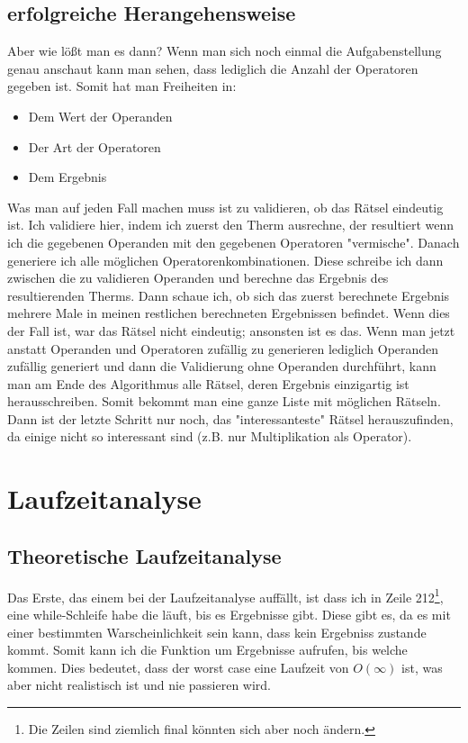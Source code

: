 \documentclass[a4paper,10pt,ngerman]{scrartcl}
\begin{document}
\subsection{erfolgreiche Herangehensweise}

Aber wie lößt man es dann?
\newline
Wenn man sich noch einmal die Aufgabenstellung genau anschaut kann man sehen, dass lediglich die Anzahl der Operatoren gegeben ist. Somit hat man Freiheiten in:
\begin{itemize}
\item Dem Wert der Operanden
\item Der Art der Operatoren
\item Dem Ergebnis
\end{itemize}
Was man auf jeden Fall machen muss ist zu validieren, ob das Rätsel eindeutig ist. Ich validiere hier, indem ich zuerst den Therm ausrechne, der resultiert wenn ich die gegebenen Operanden mit den gegebenen Operatoren "vermische". Danach generiere ich alle möglichen Operatorenkombinationen. Diese schreibe ich dann zwischen die zu validieren Operanden und berechne das Ergebnis des resultierenden Therms. Dann schaue ich, ob sich das zuerst berechnete Ergebnis mehrere Male in meinen restlichen berechneten Ergebnissen befindet. Wenn dies der Fall ist, war das Rätsel nicht eindeutig; ansonsten ist es das.
Wenn man jetzt anstatt Operanden und Operatoren zufällig zu generieren lediglich Operanden zufällig generiert und dann die Validierung ohne Operanden durchführt, kann man am Ende des Algorithmus alle Rätsel, deren Ergebnis einzigartig ist herausschreiben. Somit bekommt man eine ganze Liste mit möglichen Rätseln. Dann ist der letzte Schritt nur noch, das "interessanteste" Rätsel herauszufinden, da einige nicht so interessant sind (z.B. nur Multiplikation als Operator).

\section{Laufzeitanalyse}

\subsection{Theoretische Laufzeitanalyse}

Das Erste, das einem bei der Laufzeitanalyse auffällt, ist dass ich in Zeile 212\footnote{Die Zeilen sind ziemlich final könnten sich aber noch ändern.}, eine while-Schleife habe die läuft, bis es Ergebnisse gibt. Diese gibt es, da es mit einer bestimmten Warscheinlichkeit sein kann, dass kein Ergebniss zustande kommt. Somit kann ich die Funktion um Ergebnisse aufrufen, bis welche kommen. Dies bedeutet, dass der worst case eine Laufzeit von $O(\infty)$ ist, was aber nicht realistisch ist und nie passieren wird.
\end{document}
